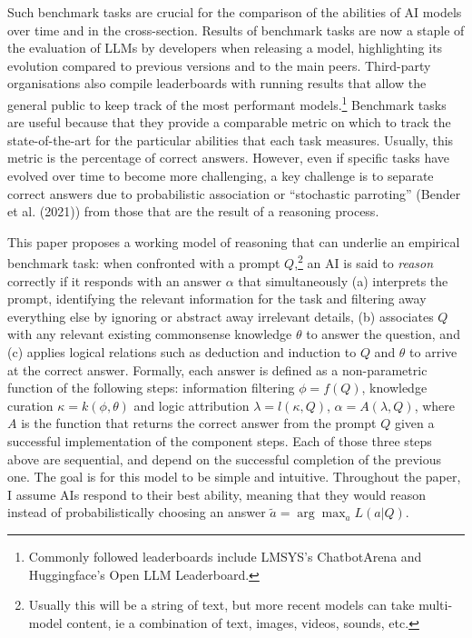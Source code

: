 \documentclass[
]{article}
\begin{document}
Such benchmark tasks are crucial for the comparison of the abilities of
AI models over time and in the cross-section. Results of benchmark tasks
are now a staple of the evaluation of LLMs by developers when releasing
a model, highlighting its evolution compared to previous versions and to
the main peers. Third-party organisations also compile leaderboards with
running results that allow the general public to keep track of the most
performant models.\footnote{Commonly followed leaderboards include
  LMSYS's ChatbotArena and Huggingface's Open LLM Leaderboard.}
Benchmark tasks are useful because that they provide a comparable metric
on which to track the state-of-the-art for the particular abilities that
each task measures. Usually, this metric is the percentage of correct
answers. However, even if specific tasks have evolved over time to
become more challenging, a key challenge is to separate correct answers
due to probabilistic association or ``stochastic parroting'' (Bender et
al. (2021)) from those that are the result of a reasoning process.

This paper proposes a working model of reasoning that can underlie an
empirical benchmark task: when confronted with a prompt
\(Q\),\footnote{Usually this will be a string of text, but more recent
  models can take multi-model content, ie a combination of text, images,
  videos, sounds, etc.} an AI is said to \emph{reason} correctly if it
responds with an answer \(\alpha\) that simultaneously (a) interprets
the prompt, identifying the relevant information for the task and
filtering away everything else by ignoring or abstract away irrelevant
details, (b) associates \(Q\) with any relevant existing commonsense
knowledge \(\theta\) to answer the question, and (c) applies logical
relations such as deduction and induction to \(Q\) and \(\theta\) to
arrive at the correct answer. Formally, each answer is defined as a
non-parametric function of the following steps: information filtering
\(\phi = f(Q)\), knowledge curation \(\kappa = k(\phi, \theta)\) and
logic attribution \(\lambda = l(\kappa, Q)\),
\(\alpha = A(\lambda, Q)\), where \(A\) is the function that returns the
correct answer from the prompt \(Q\) given a successful implementation
of the component steps. Each of those three steps above are sequential,
and depend on the successful completion of the previous one. The goal is
for this model to be simple and intuitive. Throughout the paper, I
assume AIs respond to their best ability, meaning that they would reason
instead of probabilistically choosing an answer
\(\tilde{a} = \arg \max_{a} L(a | Q)\).
\end{document}
